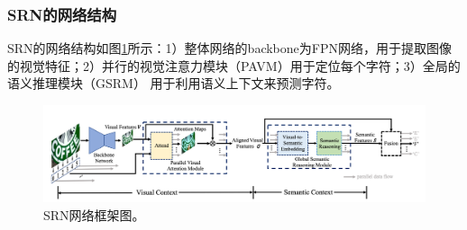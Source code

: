 \subsubsection{SRN的网络结构}
SRN的网络结构如图\ref{srn_framework}所示：1）整体网络的backbone为FPN网络，用于提取图像的视觉特征；2）并行的视觉注意力模块（PAVM）用于定位每个字符；3）全局的语义推理模块（GSRM）
用于利用语义上下文来预测字符。
\begin{figure}[H]
    \centering
    \includegraphics[width=.98\textwidth]{figure/recognition/srn_framework.png} 
    \caption{SRN网络框架图。} 
    \label{srn_framework} 
\end{figure}
